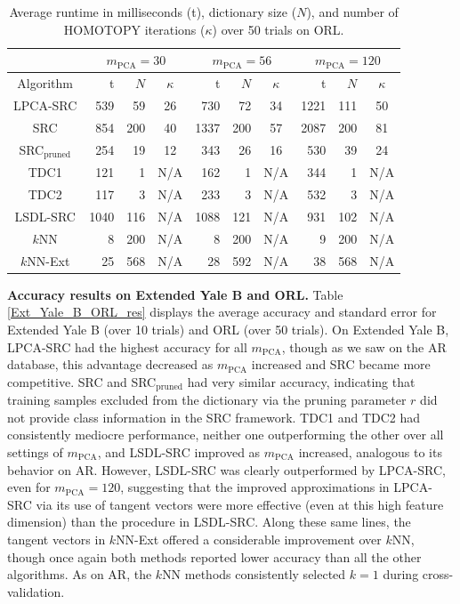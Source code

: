 \documentclass[review]{elsarticle}
\begin{document}
\begin{table}[!htb] 
\small{
\centering
\begin{tabular}{|c|r|r|c|r|r|c|r|r|c|}
\hline
& \multicolumn{3}{|c|}{$m_{\mathrm{PCA}} = 30$} & \multicolumn{3}{|c|}{$m_{\mathrm{PCA}} = 56$} & \multicolumn{3}{|c|}{$m_{\mathrm{PCA}} = 120$} \\
\hline
Algorithm & t & $N$ & $\kappa$ & t & $N$ & $\kappa$ & t & $N$ & $\kappa$ \\
\hline
	LPCA-SRC	&	539	&	59	&	26	&	730	&	72	&	34	&	1221	&	111	&	50	\\
	SRC	&	854	&	200	&	40	&	1337	&	200	&	57	&	2087	&	200	&	81	\\
	SRC$_\mathrm{pruned}$	&	254	&	19	&	12	&	343	&	26	&	16	&	530	&	39	&	24	\\
	TDC1	&	121	&	1	&	N/A	&	162	&	1	&	N/A	&	344	&	1	&	N/A	\\
	TDC2	&	117	&	3	&	N/A	&	233	&	3	&	N/A	&	532	&	3	&	N/A	\\
	LSDL-SRC	&	1040	&	116	&	N/A	&	1088	&	121	&	N/A	&	931	&	102	&	N/A	\\
	$k$NN	&	8	&	200	&	N/A	&	8	&	200	&	N/A	&	9	&	200	&	N/A	\\
	$k$NN-Ext	&	25	&	568	&	N/A		&	28	&	592	&	N/A		&	38	&	568	&	N/A	\\

\hline
\end{tabular}
\caption{Average runtime in milliseconds (t), dictionary size ($N$), and number of HOMOTOPY iterations ($\kappa$) over 50 trials on ORL.} 
\label{ORL_time}}
\end{table}


\textbf{Accuracy results on Extended Yale B and ORL.} Table \ref{Ext_Yale_B_ORL_res} displays the average accuracy and standard error for Extended Yale B (over 10 trials) and ORL (over 50 trials). On Extended Yale B, LPCA-SRC had the highest accuracy for all $m_\mathrm{PCA}$, though as we saw on the AR database, this advantage decreased as $m_\mathrm{PCA}$ increased and SRC became more competitive. SRC and SRC$_\mathrm{pruned}$ had very similar accuracy, indicating that training samples excluded from the dictionary via the pruning parameter $r$ did not provide class information in the SRC framework. TDC1 and TDC2 had consistently mediocre performance, neither one outperforming the other over all settings of $m_\mathrm{PCA}$, and LSDL-SRC improved as $m_\mathrm{PCA}$ increased, analogous to its behavior on AR. However, LSDL-SRC was clearly outperformed by LPCA-SRC, even for $m_\mathrm{PCA}=120$, suggesting that the improved approximations in LPCA-SRC via its use of tangent vectors were more effective (even at this high feature dimension) than the procedure in LSDL-SRC. Along these same lines, the tangent vectors in $k$NN-Ext offered a considerable improvement over $k$NN, though once again both methods reported lower accuracy than all the other algorithms. As on AR, the $k$NN methods consistently selected $k=1$ during cross-validation.
\end{document}
